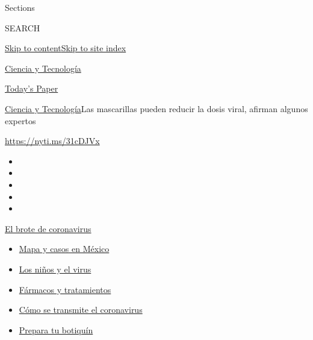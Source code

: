 Sections

SEARCH

\protect\hyperlink{site-content}{Skip to
content}\protect\hyperlink{site-index}{Skip to site index}

\href{https://www.nytimes3xbfgragh.onion/es/section/ciencia-y-tecnologia}{Ciencia
y Tecnología}

\href{https://myaccount.nytimes3xbfgragh.onion/auth/login?response_type=cookie\&client_id=vi}{}

\href{https://www.nytimes3xbfgragh.onion/section/todayspaper}{Today's
Paper}

\href{/es/section/ciencia-y-tecnologia}{Ciencia y
Tecnología}\textbar{}Las mascarillas pueden reducir la dosis viral,
afirman algunos expertos

\url{https://nyti.ms/31cDJVx}

\begin{itemize}
\item
\item
\item
\item
\item
\end{itemize}

\href{https://www.nytimes3xbfgragh.onion/es/spotlight/coronavirus?action=click\&pgtype=Article\&state=default\&region=TOP_BANNER\&context=storylines_menu}{El
brote de coronavirus}

\begin{itemize}
\tightlist
\item
  \href{https://www.nytimes3xbfgragh.onion/es/interactive/2020/espanol/america-latina/coronavirus-en-mexico.html?action=click\&pgtype=Article\&state=default\&region=TOP_BANNER\&context=storylines_menu}{Mapa
  y casos en México}
\item
  \href{https://www.nytimes3xbfgragh.onion/es/2020/07/31/espanol/ciencia-y-tecnologia/ninos-contagio-coronavirus.html?action=click\&pgtype=Article\&state=default\&region=TOP_BANNER\&context=storylines_menu}{Los
  niños y el virus}
\item
  \href{https://www.nytimes3xbfgragh.onion/es/interactive/2020/science/coronavirus-tratamientos-curas.html?action=click\&pgtype=Article\&state=default\&region=TOP_BANNER\&context=storylines_menu}{Fármacos
  y tratamientos}
\item
  \href{https://www.nytimes3xbfgragh.onion/es/2020/07/06/espanol/ciencia-y-tecnologia/coronavirus-transmision-aire.html?action=click\&pgtype=Article\&state=default\&region=TOP_BANNER\&context=storylines_menu}{Cómo
  se transmite el coronavirus}
\item
  \href{https://www.nytimes3xbfgragh.onion/es/2020/07/14/espanol/estilos-de-vida/botiquin-medicina-coronavirus.html?action=click\&pgtype=Article\&state=default\&region=TOP_BANNER\&context=storylines_menu}{Prepara
  tu botiquín}
\end{itemize}

